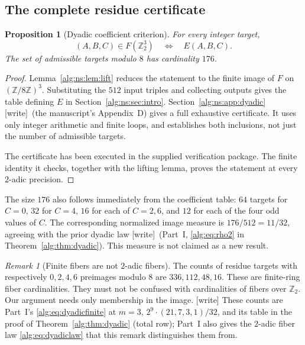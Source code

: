 \documentclass[11pt]{article}
\numberwithin{equation}{section}
\theoremstyle{plain}
\newtheorem{proposition}[proposition]{Proposition}
\theoremstyle{plain}
\theoremstyle{plain}
\theoremstyle{definition}
\theoremstyle{definition}
\theoremstyle{definition}
\theoremstyle{remark}
\newtheorem{remark}[remark]{Remark}
\newcommand{\Z}{\mathbb Z}\newcommand{\Q}{\mathbb Q}
\newcommand{\wtag}{\textup{[write]}}%
\begin{document}
\subsection{The complete residue certificate}
\begin{proposition}[Dyadic coefficient criterion]\label{alg:ns:prop:two}
For every integer target,
\begin{equation}\label{alg:ns:eq:dyadic}
(A,B,C)\in F(\Z_2^3)\quad\Longleftrightarrow\quad E(A,B,C).
\end{equation}
The set of admissible targets modulo $8$ has cardinality $176$.
\end{proposition}
\begin{proof}
Lemma~\ref{alg:ns:lem:lift} reduces the statement to the finite image of $F$
on $(\Z/8\Z)^3$. Substituting the $512$ input triples and collecting
outputs gives the table defining $E$ in Section~\ref{alg:ns:sec:intro}.
Section~\ref{alg:ns:app:dyadic} \wtag{}~(the manuscript's Appendix~D)
gives a full exhaustive certificate. It uses
only integer arithmetic and finite loops, and establishes both
inclusions, not just the number of admissible targets.

The certificate has been executed in the supplied verification package. The
finite identity it checks, together with the lifting lemma, proves the
statement at every $2$-adic precision.
\end{proof}

The size $176$ also follows immediately from the coefficient table:
$64$ targets for $C=0$, $32$ for $C=4$, $16$ for each of $C=2,6$, and
$12$ for each of the four odd values of $C$. The corresponding normalized
image measure is $176/512=11/32$, agreeing with the prior dyadic law
\wtag{}~(Part~I, \eqref{alg:eq:rho2} in Theorem~\ref{alg:thm:dyadic}). This measure is not claimed as a new result.

\begin{remark}[Finite fibers are not $2$-adic fibers]
The counts of residue targets with respectively $0,2,4,6$ preimages
modulo $8$ are $336,112,48,16$. These are finite-ring fiber cardinalities.
They must not be confused with cardinalities of fibers over $\Z_2$.
Our argument needs only membership in the image.
\wtag{} These counts are Part~I's \eqref{alg:eq:dyadicfinite} at $m=3$,
$2^9\cdot(21,7,3,1)/32$, and its table in the proof of
Theorem~\ref{alg:thm:dyadic} (total row); Part~I also gives the
$2$-adic fiber law \eqref{alg:eq:dyadiclaw} that this remark
distinguishes them from.
\end{remark}
\end{document}
